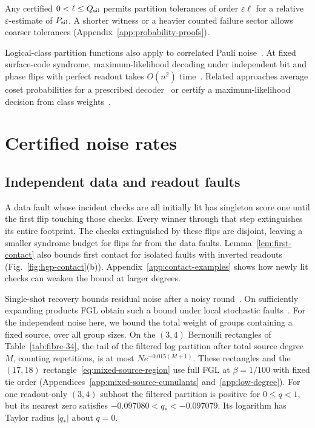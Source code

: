 \documentclass[10pt,twocolumn]{article}
\theoremstyle{definition}
\begin{document}
Any certified $0<\ell\le Q_{\rm sil}$ permits partition tolerances
of order $\varepsilon\ell$ for a relative $\varepsilon$-estimate of
$P_{\rm sil}$. A shorter witness or a heavier counted failure sector
allows coarser tolerances (Appendix~\ref{app:probability-proofs}).

Logical-class partition functions also apply to correlated Pauli
noise~\cite{CF21}. At fixed surface-code syndrome, maximum-likelihood
decoding under independent bit and phase flips with perfect readout
takes $O(n^2)$ time~\cite{BSV14}. Related approaches average coset
probabilities for a prescribed decoder~\cite{CGLW24} or certify a
maximum-likelihood decision from class weights~\cite{Kri26}.

\section{Certified noise rates}\label{sec:certificates}

\subsection{Independent data and readout faults}
A data fault whose incident checks are all initially lit has singleton
score one until the first flip touching those checks. Every winner
through that step extinguishes its entire footprint. The checks
extinguished by these flips are disjoint, leaving a smaller syndrome
budget for flips far from the data faults. Lemma~\ref{lem:first-contact}
also bounds first contact for isolated faults with inverted readouts
(Fig.~\ref{fig:hgp-contact}(b)). Appendix~\ref{app:contact-examples}
shows how newly lit checks can weaken the bound at larger degrees.

Single-shot recovery bounds residual noise after a noisy
round~\cite{Bombin15}. On sufficiently expanding products FGL obtain
such a bound under local stochastic faults~\cite[Thm.~2]{FGL18}.
For the independent noise here, we bound the total weight of groups
containing a fixed source, over all group sizes. On the $(3,4)$
Bernoulli rectangles of Table~\ref{tab:fibre-34}, the tail of the
filtered log partition after total source degree $M$, counting
repetitions, is at most $Ne^{-0.015(M+1)}$. These rectangles and the
$(17,18)$ rectangle~\eqref{eq:mixed-source-region} use full FGL
at $\beta=1/100$ with fixed tie order
(Appendices~\ref{app:mixed-source-cumulants} and~\ref{app:low-degree}).
For one readout-only $(3,4)$ subhost the filtered partition is
positive for $0\le q<1$, but its nearest zero satisfies
$-0.097080<q_*<-0.097079$. Its logarithm has Taylor radius $|q_*|$
about $q=0$.
\end{document}
